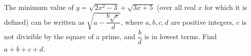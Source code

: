 The minimum value of $y=\sqrt{2x^2-3}+\sqrt{3x+5}$ (over all real $x$ for which it is defined) can be written as $\sqrt{a-\dfrac{b\sqrt c}{d}}$, where $a,b,c,d$ are positive integers, $c$ is not divisible by the square of a prime, and $\dfrac {b}{d}$ is in lowest terms. Find $a+b+c+d$.
